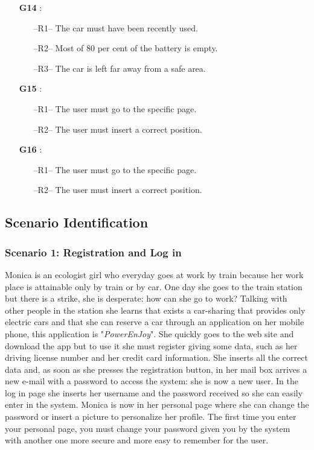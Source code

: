 \begin{itemize}
\item[\textbf{G14}]:
\begin{itemize}
\item[--R1--] The car must have been recently used.
\item[--R2--] Most of 80 per cent of the battery is empty.
\item[--R3--] The car is left far away from a safe area.
\end{itemize}


\item[\textbf{G15}]:
\begin{itemize}
\item[--R1--] The user must go to the specific page.
\item[--R2--] The user must insert a correct position. 
\end{itemize}


\item[\textbf{G16}]:
\begin{itemize}
\item[--R1--] The user must go to the specific page.
\item[--R2--] The user must insert a correct position.
\end{itemize}
\end{itemize}

\subsection{Scenario Identification} \label{sec:scenarios}
\subsubsection{Scenario 1: Registration and Log in} \label{sce1}
Monica is an ecologist girl who everyday goes at work by train because her work place is attainable only by train or by car. One day she goes to the train station but there is a strike, she is desperate: how can she go to work? Talking with other people in the station she learns that exists a car-sharing that provides only electric cars and that she can reserve a car through an application on her mobile phone, this application is "\textit{PowerEnJoy}". She quickly goes to the web site and download the app but to use it she must register giving some data, such as her driving license number and her credit card information. She inserts all the correct data and, as soon as she presses the registration button, in her mail box arrives a new e-mail with a password to access the system: she is now a new user. In the log in page she inserts her username and the password received so she can easily enter in the system. Monica is now in her personal page where she can change the password or insert a picture to personalize her profile.
The first time you enter your personal page, you must change your password given you by the system with another one more secure and more easy to remember for the user.

